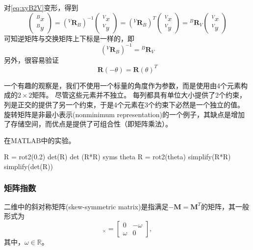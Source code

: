 \documentclass[UTF8,a4paper,10pt]{ctexart}
\begin{document}
对\eqref{eq:xyB2V}变形，得到
\begin{equation*}
  \begin{pmatrix}{}^Bx\\{}^By\end{pmatrix}=
  \left({}^V\mathbf{R}_B\right)^{-1}\begin{pmatrix}{}^Vx\\{}^Vy\end{pmatrix}=
  \left({}^V\mathbf{R}_B\right)^{T}\begin{pmatrix}{}^Vx\\{}^Vy\end{pmatrix}=
  {}^B\mathbf{R}_V\begin{pmatrix}{}^Vx\\{}^Vy\end{pmatrix}
\end{equation*}
可知逆矩阵与交换矩阵上下标是一样的，即
\begin{equation}
  \left({}^V\mathbf{R}_B\right)^{-1}={}^B\mathbf{R}_V
\end{equation}
另外，很容易验证
\begin{equation}
  \mathbf{R}(-\theta)=\mathbf{R}(\theta)^T
\end{equation}

一个有趣的观察是，我们不使用一个标量的角度作为参数，而是使用由4个元素构成的$2\times2$矩阵。
尽管这些元素并不独立。
每列都具有单位大小提供了2个约束，列是正交的提供了另一个约束，于是4个元素在3个约束下必然是一个独立的值。
旋转矩阵是非最小表示(nonminimum representation)的一个例子，其缺点是增加了存储空间，而优点是提供了可组合性（即矩阵乘法）。

在MATLAB中的实验。
\begin{matlab}
  R = rot2(0.2)
  det(R)
  det (R*R)
  syms theta
  R = rot2(theta)
  simplify(R*R)
  simplify(det(R))
\end{matlab}

\subsubsection{矩阵指数}
二维中的斜对称矩阵(skew-symmetric matrix)是指满足$-\mathbf{M}=\mathbf{M}^T$的矩阵，其一般形式为
\begin{equation}
  [\omega]_{\times}=
  \begin{bmatrix}0&-\omega\\\omega&0\end{bmatrix},
\end{equation}
其中，$\omega\in\mathbb{R}$。
\end{document}
